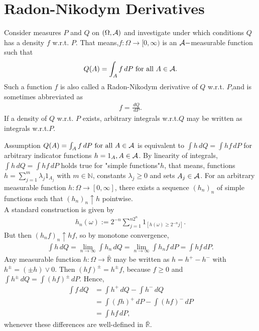 \documentclass{report}
\begin{document}
\section{Radon-Nikodym Derivatives}
Consider measures $P$ and $Q$ on $(\Omega,\mathcal A)$ and investigate under which conditions $Q$ has a density $f$ w.r.t. $P$. That means,$f:\Omega\to[0,\infty)$ is an $\mathcal A-$measurable function such that 
\begin{align}
    Q(A)=\int_Af\,dP\text{ for all } A\in\mathcal A.
\end{align}Such a function $f$ is also called a Radon-Nikodym derivative of $Q$ w.r.t. $P$,and is sometimes abbreviated as 
\begin{align}
    f=\frac{\,dQ}{\,dP}.
\end{align}If a density of $Q$ w.r.t. $P$ exists, arbitrary integrals w.r.t.$Q$ may be written as integrals w.r.t.$P$.
\begin{myproof}
    Assumption $ Q(A)=\int_Af\,dP\text{ for all } A\in\mathcal A$ is equivalent to $ \int h\,dQ=\int hf\,dP$ for arbitrary indicator functions $h=1_A,A\in\mathcal A$. By linearity of integrals, $ \int h\,dQ=\int hf\,dP$ holds true for "simple functions"$h$, that means, functions  $h=\sum_{j=1}^m\lambda_j1_{A_j}$ with $m\in\mathbb{N}$, constants $\lambda_j\geq 0$ and sets $A_j\in\mathcal A$. For an arbitrary measurable function $h:\Omega\to[0,\infty]$, there exists a sequence $(h_n)_n$ of simple functions such that $(h_n)_n\uparrow h$ pointwise. \\
    A standard construction is given by
    \begin{align*}
        h_n(\omega):=2^{-n}\sum_{j=1}^{n2^n}1_{[h(\omega)\geq 2^{-n}j]}.
    \end{align*}But then $(h_nf)_n\uparrow hf$, so by monotone convergence,
    \begin{align*}
        \int h\,dQ=\lim_{n\to\infty} \int h_n\,dQ=\lim_{n\to\infty}\int h_nf\,dP=\int hf\,dP.
    \end{align*}Any measurable function $h:\Omega\to\bar{\mathbb{R}}$ may be written as $h=h^+-h^-$ with $h^{\pm}=(\pm h)\vee 0$. Then $(hf)^{\pm}=h^{\pm}f$, because $f\geq 0$ and $\int h^{\pm}\,dQ=\int(hf)^{\pm}\,dP$. Hence,
    \begin{align*}
        \int f\,dQ&=\int h^+\,dQ-\int h^-\,dQ\\
        &=\int (fh)^+\,dP-\int (hf)^-\,dP\\
        &=\int hf \,dP,
    \end{align*}whenever these differences are well-defined in $\bar{\mathbb{R}}$.
\end{myproof}
\end{document}
